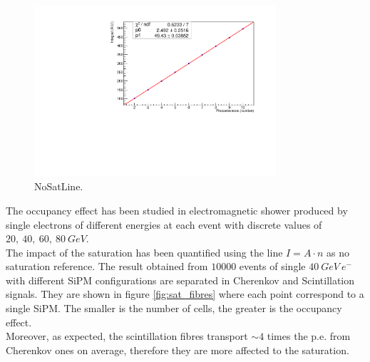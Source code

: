 \begin{figure}
	\centering
	\includegraphics[width=0.8\textwidth]{IMG/NoSatLine}
	\caption{NoSatLine.}
	\label{fig:NoSatLine}
\end{figure}

The occupancy effect has been studied in electromagnetic shower produced by single electrons of different energies at each event with discrete values of $20,\ 40,\ 60,\ 80\ GeV$.\\
The impact of the saturation has been quantified using the line $I = A\cdot n$ as no saturation reference. The result obtained from $10000$ events of single $40\ GeV\ e^-$ with different SiPM configurations are separated in Cherenkov and Scintillation signals. They are shown in figure \ref{fig:sat_fibres} where each point correspond to a single SiPM. The smaller is the number of cells, the greater is the occupancy effect.\\
Moreover, as expected, the scintillation fibres transport $\sim 4$ times the p.e. from Cherenkov ones on average, therefore they are more affected to the saturation.\\

